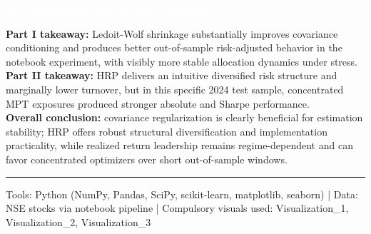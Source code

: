 \documentclass[10pt,a4paper]{article}
\newcommand{\SectionBar}[1]{%
  \vspace{0.35em}
  \noindent\colorbox{ReportBlue}{%
    \parbox{\dimexpr\linewidth-2\fboxsep\relax}{%
      \vspace{2.5pt}\textcolor{white}{\bfseries\footnotesize #1}\vspace{2.5pt}
    }%
  }%
  \vspace{0.35em}
}
\begin{document}
\SectionBar{4 \;|\; Consolidated Insights and Conclusion}
{\fontsize{8.1}{10.7}\selectfont\justifying
\textbf{Part I takeaway:} Ledoit-Wolf shrinkage substantially improves covariance conditioning and produces better out-of-sample risk-adjusted behavior in the notebook experiment, with visibly more stable allocation dynamics under stress.\\
\textbf{Part II takeaway:} HRP delivers an intuitive diversified risk structure and marginally lower turnover, but in this specific 2024 test sample, concentrated MPT exposures produced stronger absolute and Sharpe performance.\\
\textbf{Overall conclusion:} covariance regularization is clearly beneficial for estimation stability; HRP offers robust structural diversification and implementation practicality, while realized return leadership remains regime-dependent and can favor concentrated optimizers over short out-of-sample windows.
}

\vspace{6pt}
\noindent\textcolor{MidGray}{\rule{\linewidth}{0.8pt}}
\vspace{2pt}
\begin{center}
  {\fontsize{6.7}{8.3}\selectfont\textcolor{FooterGray}{Tools: Python (NumPy, Pandas, SciPy, scikit-learn, matplotlib, seaborn) \;|\; Data: NSE stocks via notebook pipeline \;|\; Compulsory visuals used: Visualization\_1, Visualization\_2, Visualization\_3}}
\end{center}
\end{document}

